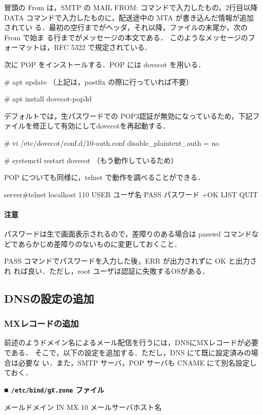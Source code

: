 冒頭の From は，SMTP の MAIL FROM: コマンドで入力したもの，2行目以降DATA 
コマンドで入力したものに，配送途中の MTA が書き込んだ情報が追加されてい
る．最初の空行までがヘッダ，それ以降，ファイルの末尾か，次の From で始ま
る行までがメッセージの本文である．
このようなメッセージのフォーマットは，RFC 5322 で規定されている．

次に POP をインストールする．POP には dovecot を用いる．

\begin{cli}
# apt update
（上記は，postfix の際に行っていれば不要）

# apt install dovecot-pop3d
\end{cli}

デフォルトでは，生パスワードでの POP3認証が無効になっているため，下記ファイルを修正して有効にしてdovecotを再起動する．

\begin{cli}
# vi /etc/dovecot/conf.d/10-auth.conf
disable_plaintext_auth = no

# systemctl restart dovecot （もう動作しているため）
\end{cli}

POP についても同様に，telnet で動作を調べることができる．
\begin{cli}
server#telnet localhost 110
USER ユーザ名
PASS パスワード
+OK
LIST
QUIT
\end{cli}
\paragraph{注意} パスワードは生で画面表示されるので，差障りのある場合は
passwd コマンドなどであらかじめ差障りのないものに変更しておくこと．

PASS コマンドでパスワードを入力した後，ERR が出力されずに OK と出力され
れば良い．ただし，root ユーザは認証に失敗するOSがある．

\subsection{DNSの設定の追加}
\subsubsection{MXレコードの追加}
前述のようドメイン名によるメール配信を行うには，DNSにMXレコードが必要である．
そこで，以下の設定を追加する．ただし，DNS にて既に設定済みの場合は必要な
い．また，SMTP サーバ，POP サーバも CNAME にて別名設定しておく．

\noindent
{\bf ■ \texttt{/etc/bind/gX.zone} ファイル}
\begin{cli}
メールドメイン           IN      MX 10   メールサーバホスト名
\end{cli}

